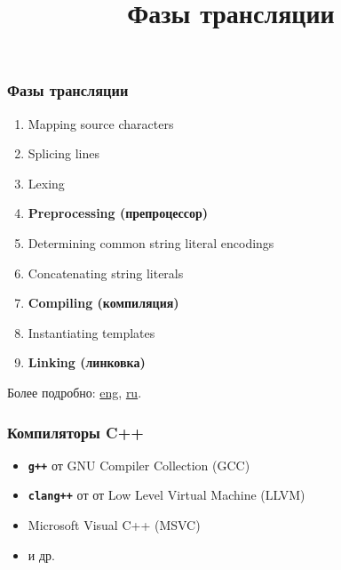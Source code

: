 \documentclass[compress]{beamer}
\title{Фазы трансляции}
\begin{document}
\frame[plain]{\titlepage}

\begin{frame}

    \frametitle{Фазы трансляции}

    \begin{enumerate}

        \item Mapping source characters

        \item Splicing lines

        \item Lexing

        \item \textbf{Preprocessing (препроцессор)}

        \item Determining common string literal encodings

        \item Concatenating string literals

        \item \textbf{Compiling (компиляция)}

        \item Instantiating templates

        \item \textbf{Linking (линковка)}

    \end{enumerate}

    \vfill

    Более подробно:
    \href{https://en.cppreference.com/w/cpp/language/translation_phases}{eng},
    \href{https://ru.cppreference.com/w/cpp/language/translation_phases}{ru}.

\end{frame}

\begin{frame}

    \frametitle{Компиляторы C++}

    \begin{itemize}

        \item \texttt{\textbf{g++}} от GNU Compiler Collection (GCC)

        \item \texttt{\textbf{clang++}} от от Low Level Virtual Machine (LLVM)

        \item Microsoft Visual C++ (MSVC)

        \item и др.

    \end{itemize}

\end{frame}
\end{document}
